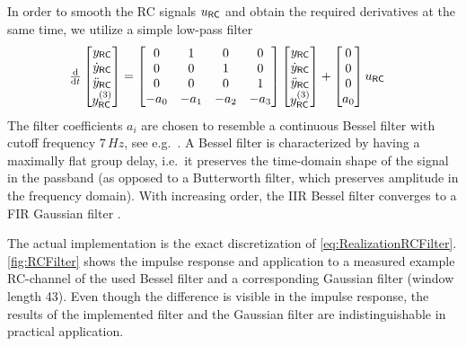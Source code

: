 In order to smooth the RC signals $\uRC$ and obtain the required derivatives at the same time, we utilize a simple low-pass filter
\begin{align}\label{eq:RealizationRCFilter}
 \tdiff{t} \begin{bmatrix} \yRC[] \\ \yRCd[] \\ \yRCdd[] \\ \yRCddd[] \end{bmatrix}
 &= \begin{bmatrix} 0 & 1 & 0 & 0 \\ 0 & 0 & 1 & 0 \\ 0 & 0 & 0 & 1 \\ -a_0 & -a_1 & -a_2 & -a_3 \end{bmatrix}
 \begin{bmatrix} \yRC[] \\ \yRCd[] \\ \yRCdd[] \\ \yRCddd[] \end{bmatrix}
 + \begin{bmatrix} 0 \\ 0 \\ 0 \\ a_0 \end{bmatrix}
 \uRC[]
\end{align}
The filter coefficients $a_i$ are chosen to resemble a continuous Bessel filter with cutoff frequency $7\,\unit{Hz}$, see e.g.\ \cite[sec.\,13.1.3]{TietzeSchenk:Halbleiter-Schaltungstechnik}.
A Bessel filter is characterized by having a maximally flat group delay, i.e.\ it preserves the time-domain shape of the signal in the passband (as opposed to a Butterworth filter, which preserves amplitude in the frequency domain).
With increasing order, the IIR Bessel filter converges to a FIR Gaussian filter \cite[sec.\ 4.9.2]{Rabiner:DSP}.

The actual implementation is the exact discretization of \eqref{eq:RealizationRCFilter}.
\autoref{fig:RCFilter} shows the impulse response and application to a measured example RC-channel of the used Bessel filter and a corresponding Gaussian filter (window length 43).
Even though the difference is visible in the impulse response, the results of the implemented filter and the Gaussian filter are indistinguishable in practical application.


